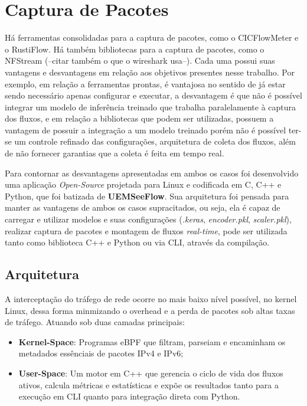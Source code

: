 \section{Captura de Pacotes}

\par{
Há ferramentas consolidadas para a captura de pacotes, como o CICFlowMeter e o RustiFlow. 
Há também bibliotecas para a captura de pacotes, como o NFStream (--citar também o que o wireshark usa--). 
Cada uma possui suas vantagens e desvantagens em relação aos objetivos presentes nesse trabalho.
Por exemplo, em relação a ferramentas prontas, é vantajosa no sentido de já estar sendo necessário apenas configurar e executar, a desvantagem é que não é possível integrar um modelo de inferência treinado que trabalha paralelamente à captura dos fluxos, e em relação a bibliotecas que podem ser utilizadas, possuem a vantagem de possuir a integração a um modelo treinado porém não é possível ter-se um controle refinado das configurações, arquitetura de coleta dos fluxos, além de não fornecer garantias que a coleta é feita em tempo real.
}

\par{
Para contornar as desvantagens apresentadas em ambos os casos foi desenvolvido uma aplicação \emph{Open-Source} projetada para Linux e codificada em C, C++ e Python, que foi batizada de \textbf{UEMSeeFlow}. 
Sua arquitetura foi pensada para manter as vantagens de ambos os casos supracitados, ou seja, ela é capaz de carregar e utilizar modelos e suas configurações (\emph{.keras}, \emph{encoder.pkl}, \emph{scaler.pkl}), realizar captura de pacotes e montagem de fluxos \emph{real-time}, pode ser utilizada tanto como biblioteca C++ e Python ou via CLI, através da compilação.
}

\subsection{Arquitetura}

\par{

A interceptação do tráfego de rede ocorre no mais baixo nível possível, no kernel Linux, dessa forma minmizando o overhead e a perda de pacotes sob altas taxas de tráfego. Atuando sob duas camadas principais:
    \begin{itemize}
        \item \textbf{Kernel-Space}: Programas eBPF que filtram, parseiam e encaminham os metadados essênciais de pacotes IPv4 e IPv6;
        \item \textbf{User-Space}: Um motor em C++ que gerencia o ciclo de vida dos fluxos ativos, calcula métricas e estatísticas e expõe os resultados tanto para a execução em CLI quanto para integração direta com Python.
    \end{itemize}
}
